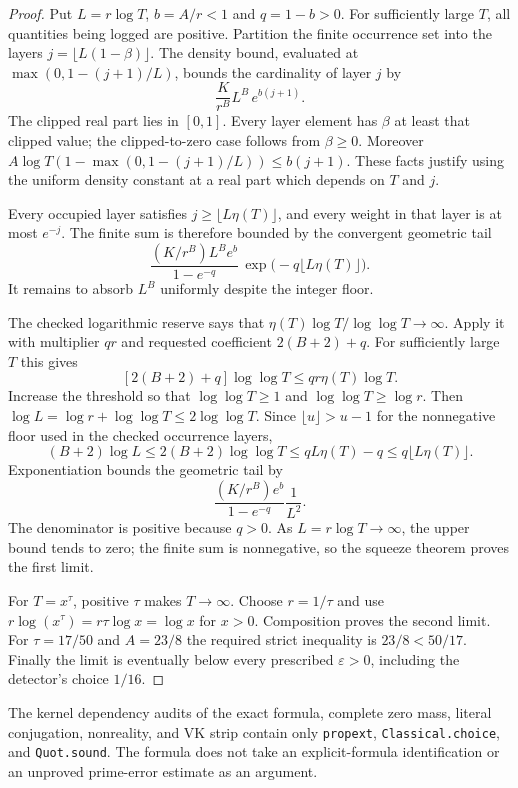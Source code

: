 \begin{proof}
Put $L=r\log T$, $b=A/r<1$ and $q=1-b>0$.
For sufficiently large $T$, all quantities being logged are positive.
Partition the finite occurrence set into the layers
$j=\lfloor L(1-\beta)\rfloor$.
The density bound, evaluated at
$\max(0,1-(j+1)/L)$, bounds the cardinality of layer $j$ by
\[
 \frac{K}{r^B}L^B\,e^{b(j+1)}.
\]
The clipped real part lies in $[0,1]$.
Every layer element has $\beta$ at least that clipped value;
the clipped-to-zero case follows from $\beta\ge0$.
Moreover
$A\log T(1-\max(0,1-(j+1)/L))\le b(j+1)$.
These facts justify using the uniform density constant at a real
part which depends on $T$ and $j$.

Every occupied layer satisfies $j\ge\lfloor L\eta(T)\rfloor$,
and every weight in that layer is at most $e^{-j}$.
The finite sum is therefore bounded by the convergent geometric
tail
\[
 \frac{(K/r^B)L^B e^b}{1-e^{-q}}\,
       \exp\bigl(-q\lfloor L\eta(T)\rfloor\bigr).
\]
It remains to absorb $L^B$ uniformly despite the integer floor.

The checked logarithmic reserve says that
$\eta(T)\log T/\log\log T\to\infty$.
Apply it with multiplier $qr$ and requested coefficient
$2(B+2)+q$.
For sufficiently large $T$ this gives
\[
 [2(B+2)+q]\log\log T\le qr\eta(T)\log T.
\]
Increase the threshold so that
$\log\log T\ge1$ and $\log\log T\ge\log r$.
Then $\log L=\log r+\log\log T\le2\log\log T$.
Since $\lfloor u\rfloor>u-1$ for the nonnegative floor used in
the checked occurrence layers,
\[
 (B+2)\log L
 \le 2(B+2)\log\log T
 \le qL\eta(T)-q
 \le q\lfloor L\eta(T)\rfloor.
\]
Exponentiation bounds the geometric tail by
\[
 \frac{(K/r^B)e^b}{1-e^{-q}}\frac1{L^2}.
\]
The denominator is positive because $q>0$.
As $L=r\log T\to\infty$, the upper bound tends to zero;
the finite sum is nonnegative, so the squeeze theorem proves
the first limit.

For $T=x^\tau$, positive $\tau$ makes $T\to\infty$.
Choose $r=1/\tau$ and use
$r\log(x^\tau)=r\tau\log x=\log x$ for $x>0$.
Composition proves the second limit.
For $\tau=17/50$ and $A=23/8$ the required strict inequality is
$23/8<50/17$.
Finally the limit is eventually below every prescribed
$\varepsilon>0$, including the detector's choice $1/16$.
\end{proof}

The kernel dependency audits of the exact formula, complete zero mass,
literal conjugation, nonreality, and VK strip contain only
\texttt{propext}, \texttt{Classical.choice}, and \texttt{Quot.sound}.
The formula does not take an explicit-formula identification or an
unproved prime-error estimate as an argument.
